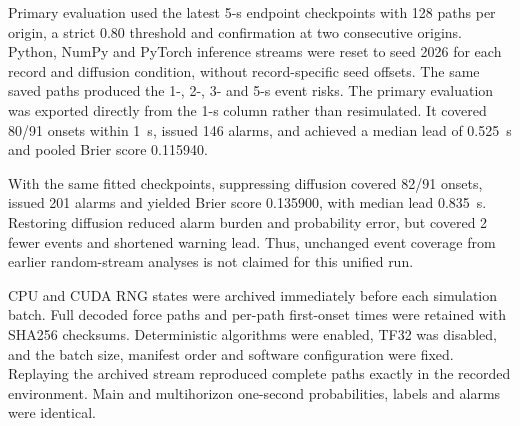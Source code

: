 Primary evaluation used the latest 5-s endpoint checkpoints with 128 paths per origin, a strict 0.80 threshold and confirmation at two consecutive origins. Python, NumPy and PyTorch inference streams were reset to seed 2026 for each record and diffusion condition, without record-specific seed offsets. The same saved paths produced the 1-, 2-, 3- and 5-s event risks. The primary evaluation was exported directly from the 1-s column rather than resimulated. It covered 80/91 onsets within 1~s, issued 146 alarms, and achieved a median lead of 0.525~s and pooled Brier score 0.115940.

With the same fitted checkpoints, suppressing diffusion covered 82/91 onsets, issued 201 alarms and yielded Brier score 0.135900, with median lead 0.835~s. Restoring diffusion reduced alarm burden and probability error, but covered 2 fewer events and shortened warning lead. Thus, unchanged event coverage from earlier random-stream analyses is not claimed for this unified run.

CPU and CUDA RNG states were archived immediately before each simulation batch. Full decoded force paths and per-path first-onset times were retained with SHA256 checksums. Deterministic algorithms were enabled, TF32 was disabled, and the batch size, manifest order and software configuration were fixed. Replaying the archived stream reproduced complete paths exactly in the recorded environment. Main and multihorizon one-second probabilities, labels and alarms were identical.
